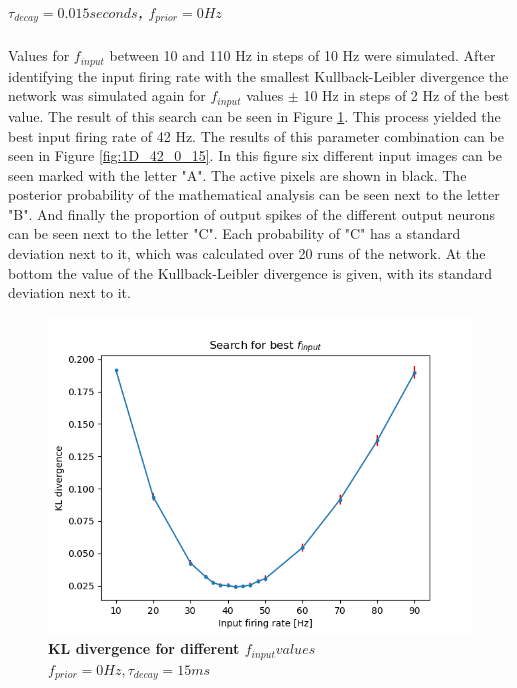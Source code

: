 \subparagraph{$\tau_{decay} = 0.015 seconds$, $f_{prior} = 0 Hz$}
Values for $f_{input}$ between 10 and 110 Hz in steps of 10 Hz were simulated. After identifying the input firing rate with the smallest Kullback-Leibler divergence the network was simulated again for $f_{input}$ values $\pm$ 10 Hz in steps of 2 Hz of the best value. The result of this search can be seen in Figure \ref{fig:1D_KLD_fPrior0_tau15}. This process yielded the best input firing rate of 42 Hz. The results of this parameter combination can be seen in Figure \ref{fig:1D_42_0_15}. In this figure six different input images can be seen marked with the letter "A". The active pixels are shown in black.  The posterior probability of the mathematical analysis can be seen next to the letter "B". And finally the proportion of output spikes of the different output neurons can be seen next to the letter "C". Each probability of "C" has a standard deviation next to it, which was calculated over 20 runs of the network. At the bottom the value of the Kullback-Leibler divergence is given, with its standard deviation next to it.

\begin{figure}
  \includegraphics[width=\linewidth]{figures/1D/KLDvsfInput_fPrior0tau15.png}
  \caption{\textbf{KL divergence for different $f_{input} values$} $f_{prior} = 0 Hz, \tau_{decay} = 15 ms$}
  \label{fig:1D_KLD_fPrior0_tau15}
\end{figure}

